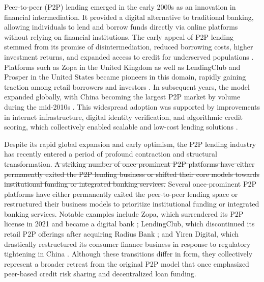 \documentclass[pdflatex,sn-apa]{sn-jnl}%
\theoremstyle{thmstyleone}%
\theoremstyle{thmstyletwo}%
\theoremstyle{thmstylethree}%
\begin{document}
Peer-to-peer (P2P) lending emerged in the early 2000s as an innovation in financial intermediation. It provided a digital alternative to traditional banking, allowing individuals to lend and borrow funds directly via online platforms without relying on financial institutions. The early appeal of P2P lending stemmed from its promise of disintermediation, reduced borrowing costs, higher investment returns, and expanded access to credit for underserved populations \citep{klafft_peer_2008, freedman_information_2017}. Platforms such as Zopa in the United Kingdom as well as LendingClub and Prosper in the United States became pioneers in this domain, rapidly gaining traction among retail borrowers and investors \citep{Morse2015463}. In subsequent years, the model expanded globally, with China becoming the largest P2P market by volume during the mid-2010s \citep{huang_online_2018}. This widespread adoption was supported by improvements in internet infrastructure, digital identity verification, and algorithmic credit scoring, which collectively enabled scalable and low-cost lending solutions \citep{bone-winkel_improving_2024}.

Despite its rapid global expansion and early optimism, the P2P lending industry has recently entered a period of profound contraction and structural transformation. \sout{A striking number of once-prominent P2P platforms have either permanently exited the P2P lending business or shifted their core models towards institutional funding or integrated banking services.} \textcolor{NavyBlue}{Several once-prominent P2P platforms have either permanently exited the peer-to-peer lending space or restructured their business models to prioritize institutional funding or integrated banking services.} Notable examples include Zopa, which surrendered its P2P license in 2021 and became a digital bank \citep{zopa_bank_limited_zopa_2021,zopa_bank_limited_our_2023}; LendingClub, which discontinued its retail P2P offerings after acquiring Radius Bank \citep{frankel_lendingclub_2020}; and Yiren Digital, which drastically restructured its consumer finance business in response to regulatory tightening in China \citep{economic_daily_p2p_2015, nemoto_optimal_2019}. Although these transitions differ in form, they collectively represent a broader retreat from the original P2P model that once emphasized peer-based credit risk sharing and decentralized loan funding.
\end{document}
